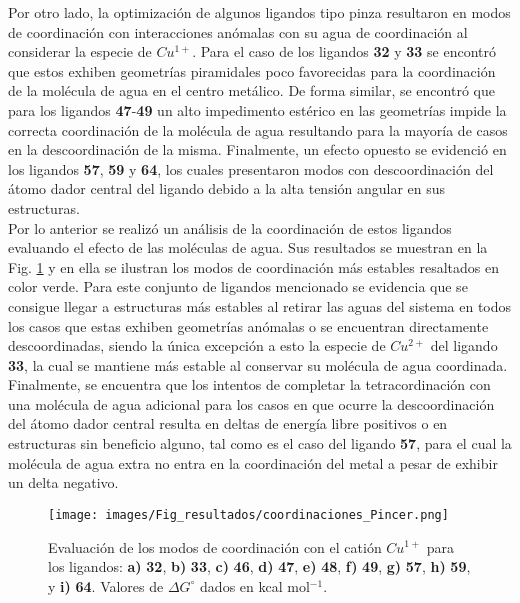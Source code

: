Por otro lado, la optimización de algunos ligandos tipo pinza resultaron en modos de coordinación con interacciones anómalas con su agua de coordinación al considerar la especie de $Cu^{1+}$. Para el caso de los ligandos \textbf{32} y \textbf{33} se encontró que estos exhiben geometrías piramidales poco favorecidas para la coordinación de la molécula de agua en el centro metálico. De forma similar, se encontró que para los ligandos \textbf{47}-\textbf{49} un alto impedimento estérico en las geometrías impide la correcta coordinación de la molécula de agua resultando para la mayoría de casos en la descoordinación de la misma. Finalmente, un efecto opuesto se evidenció en los ligandos \textbf{57}, \textbf{59} y \textbf{64}, los cuales presentaron modos con descoordinación del átomo dador central del ligando debido a la alta tensión angular en sus estructuras.\\

Por lo anterior se realizó un análisis de la coordinación de estos ligandos evaluando el efecto de las moléculas de agua. Sus resultados se muestran en la Fig. \ref{coordinaciones_pincer} y en ella se ilustran los modos de coordinación más estables resaltados en color verde. Para este conjunto de ligandos mencionado se evidencia que se consigue llegar a estructuras más estables al retirar las aguas del sistema en todos los casos que estas exhiben geometrías anómalas o se encuentran directamente descoordinadas, siendo la única excepción a esto la especie de $Cu^{2+}$ del ligando \textbf{33}, la cual se mantiene más estable al conservar su molécula de agua coordinada. Finalmente, se encuentra que los intentos de completar la tetracordinación con una molécula de agua adicional para los casos en que ocurre la descoordinación del átomo dador central resulta en deltas de energía libre positivos o en estructuras sin beneficio alguno, tal como es el caso del ligando \textbf{57}, para el cual la molécula de agua extra no entra en la coordinación del metal a pesar de exhibir un delta negativo.\\

\hspace{0cm}
\vfill
\begin{figure}[ht] 
\centering
\centerline{\texttt{[image: images/Fig\_resultados/coordinaciones\_Pincer.png]}}
\caption{Evaluación de los modos de coordinación con el catión $Cu^{1+}$ para los ligandos: \textbf{a)} \textbf{32}, \textbf{b)} \textbf{33}, \textbf{c)} \textbf{46}, \textbf{d)} \textbf{47}, \textbf{e)} \textbf{48}, \textbf{f)} \textbf{49}, \textbf{g)} \textbf{57}, \textbf{h)} \textbf{59}, y \textbf{i)} \textbf{64}. Valores de $\Delta G^{\circ}$ dados en kcal mol$^{-1}$.}
\label{coordinaciones_pincer}
\end{figure}
\hspace{0cm}
\vfill